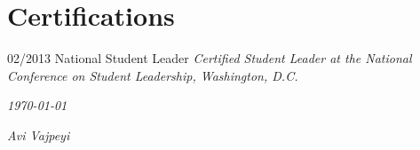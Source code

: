 \documentclass[]{friggeri-cv}
\begin{document}
\section{Certifications}
\begin{entrylist}
  \entry
    {02/2013}
    {National Student Leader}
    {}
    {\emph{{Certified Student Leader at the National Conference on Student Leadership, Washington, D.C.}}}
\end{entrylist}



\begin{flushleft}
\emph{\today}
\end{flushleft}
\begin{flushright}
\emph{Avi Vajpeyi}
\end{flushright}
\end{document}

